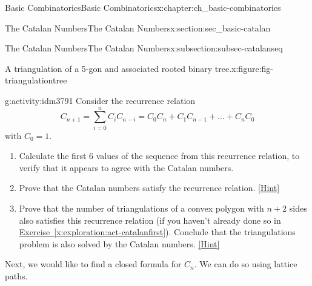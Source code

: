 \documentclass[oneside,10pt,]{book}
\numberwithin{equation}{chapter}
\def\fivegon{%
    \coordinate (a) at (0,2.5);
    \coordinate (b) at (2,1.4);
    \coordinate (c) at (1,0);
    \coordinate (d) at (-.5,0);
    \coordinate (e) at (-2,1.5);
    \draw (a) -- (b) -- (c) -- (d) -- (e) -- (a);
  }
\newcommand{\vtx}[2]{node[fill,circle,inner sep=0pt, minimum size=4pt,label=#1:#2]{}}
\newcommand{\va}[1]{\vtx{above}{#1}}
\newcommand{\vr}[1]{\vtx{right}{#1}}
\newcommand{\vl}[1]{\vtx{left}{#1}}
\renewcommand{\v}{\vtx{above}{}}
\begin{document}
\begin{chapterptx}{Basic Combinatorics}{}{Basic Combinatorics}{}{}{x:chapter:ch_basic-combinatorics}
\begin{sectionptx}{The Catalan Numbers}{}{The Catalan Numbers}{}{}{x:section:sec_basic-catalan}
\begin{subsectionptx}{The Catalan Numbers}{}{The Catalan Numbers}{}{}{x:subsection:subsec-catalanseq}
\begin{figureptx}{A triangulation of a 5-gon and associated rooted binary tree.}{x:figure:fig-triangulationtree}
\begin{sidebyside}{2}{0.125}{0.125}{0.25}
\begin{sbspanel}{0.25}
        \end{sbspanel}%
\begin{sbspanel}{0.25}%

        \end{sbspanel}%
\end{sidebyside}%
\tcblower
\end{figureptx}%
\begin{activity}{}{g:activity:idm3791}%
Consider the recurrence relation%
\begin{equation*}
C_{n + 1} = \sum_{i = 0}^n C_iC_{n-i} = C_{0}C_{n} + C_{1}C_{n - 1} + \ldots + C_{n}C_{0}
\end{equation*}
with \(C_0 = 1\).%
\begin{enumerate}[font=\bfseries,label=(\alph*),ref=\alph*]
\item{}Calculate the first 6 values of the sequence from this recurrence relation, to verify that it appears to agree with the Catalan numbers.%
\item{}Prove that the Catalan numbers satisfy the recurrence relation.%
\space\hspace*{0pt}\hfill{\tiny\hyperlink{g:hint:idm3804-back}{[Hint]}}\item{}Prove that the number of triangulations of a convex polygon with \(n+2\) sides also satisfies this recurrence relation (if you haven't already done so in \hyperref[x:exploration:act-catalanfirst]{Exercise~\ref{x:exploration:act-catalanfirst}}).  Conclude that the triangulations problem is also solved by the Catalan numbers.%
\space\hspace*{0pt}\hfill{\tiny\hyperlink{g:hint:idm3829-back}{[Hint]}}\end{enumerate}
\end{activity}
Next, we would like to find a closed formula for \(C_n\).  We can do so using lattice paths.%

\end{subsectionptx}
\end{sectionptx}
\end{chapterptx}
\end{document}
